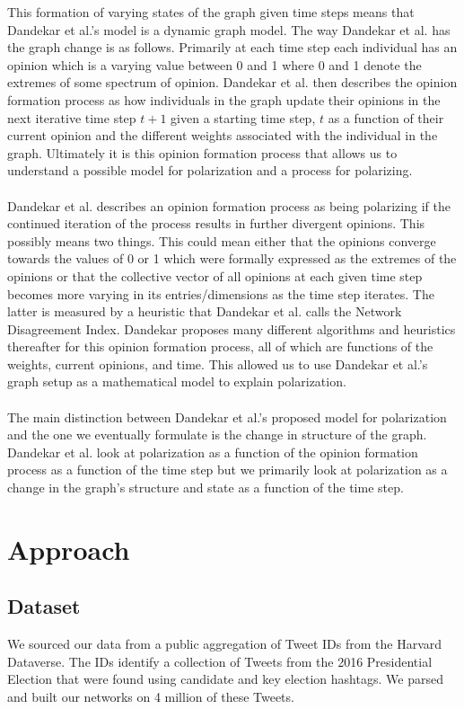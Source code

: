 \documentclass{article}
\begin{document}
This formation of varying states of the graph given time steps means that Dandekar et al.'s model is a dynamic graph model. The way Dandekar et al. has the graph change is as follows. Primarily at each time step each individual has an opinion which is a varying value between 0 and 1 where 0 and 1 denote the extremes of some spectrum of opinion. Dandekar et al. then describes the opinion formation process as how individuals in the graph update their opinions in the next iterative time step $t+1$ given a starting time step, $t$ as a function of their current opinion and the different weights associated with the individual in the graph. Ultimately it is this opinion formation process that allows us to understand a possible model for polarization and a process for polarizing.
\\\\
Dandekar et al. describes an opinion formation process as being polarizing if the continued iteration of the process results in further divergent opinions. This possibly means two things. This could mean either that the opinions converge towards the values of 0 or 1 which were formally expressed as the extremes of the opinions or that the collective vector of all opinions at each given time step becomes more varying in its entries/dimensions as the time step iterates. The latter is measured by a heuristic that Dandekar et al. calls the Network Disagreement Index\cite{goel}. Dandekar proposes many different algorithms and heuristics thereafter for this opinion formation process, all of which are functions of the weights, current opinions, and time. This allowed us to use Dandekar et al.'s graph setup as a mathematical model to explain polarization.
\\\\
The main distinction between Dandekar et al.'s proposed model for polarization and the one we eventually formulate is the change in structure of the graph. Dandekar et al. look at polarization as a function of the opinion formation process as a function of the time step but we primarily look at polarization as a change in the graph's structure and state as a function of the time step. 
\section{Approach} 
\subsection{Dataset}
We sourced our data from a public aggregation of Tweet IDs from the Harvard Dataverse\cite{dataverse}. The IDs identify a collection of Tweets from the 2016 Presidential Election that were found using candidate and key election hashtags. We parsed and built our networks on 4 million of these Tweets.
\end{document}
